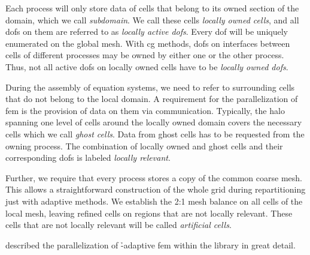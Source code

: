 Each process will only store data of cells that belong to its owned section of the domain, which we call \textit{subdomain}. We call these cells \textit{locally owned cells}, and all \glspl{dof} on them are referred to as \textit{locally active \glspl{dof}}. Every \gls{dof} will be uniquely enumerated on the global mesh. With \gls{cg} methods, \glspl{dof} on interfaces between cells of different processes may be owned by either one or the other process. Thus, not all active \glspl{dof} on locally owned cells have to be \textit{locally owned \glspl{dof}}.

During the assembly of equation systems, we need to refer to surrounding cells that do not belong to the local domain. A requirement for the parallelization of \gls{fem} is the provision of data on them via communication. Typically, the halo spanning one level of cells around the locally owned domain covers the necessary cells which we call \textit{ghost cells}. Data from ghost cells has to be requested from the owning process. The combination of locally owned and ghost cells and their corresponding \glspl{dof} is labeled \textit{locally relevant}.

Further, we require that every process stores a copy of the common coarse mesh. This allows a straightforward construction of the whole grid during repartitioning just with adaptive methods. We establish the 2:1 mesh balance on all cells of the local mesh, leaving refined cells on regions that are not locally relevant. These cells that are not locally relevant will be called \textit{artificial cells}.




\textcite{heister2011,bangerth2012} described the parallelization of \h-adaptive \gls{fem} within the \dealii{} library \textcite{dealii920pre} in great detail.